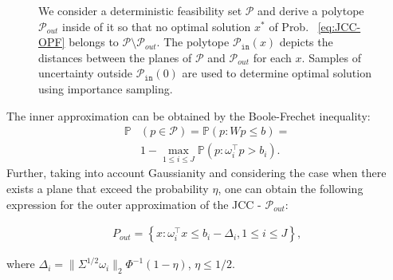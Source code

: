 \begin{figure}
\caption{We consider a deterministic feasibility set $\mathcal{P}$ and derive a polytope $\mathcal{P}_{out}$ inside of it so that no optimal solution $x^*$ of Prob.~ \eqref{eq:JCC-OPF} belongs to $\mathcal{P}\setminus \mathcal{P}_{out}$. The polytope $\mathcal{P}_{\texttt{in}}(x)$ depicts the distances between the planes of $\mathcal{P}$ and $\mathcal{P}_{out}$ for each $x$.
Samples of uncertainty outside $\mathcal{P}_{\texttt{in}}(0)$ are used to determine optimal solution using importance sampling.}
  \label{fig:10}
\end{figure}

The inner approximation can be obtained by the Boole-Frechet inequality:
\begin{align*}
  \mathbb{P}&(p\in \mathcal{P}) = 
  \mathbb{P}(p: Wp \le b) =\\
  & 1 - \max_{1\le i\le J}\mathbb{P}\left(p: \omega_i^\top p > b_i\right).
\end{align*}
Further, taking into account Gaussianity and considering the case when there exists a plane that exceed the probability $\eta$, one can obtain the following expression for the outer approximation of the JCC - $\mathcal{P}_{out}$:

\begin{align}\label{eq:05}
  P_{out} = \left\{x: \omega_i^\top x \le b_i - \Delta_i, 1\leq i\leq J\right\},
\end{align}

where $\Delta_i = \|\Sigma^{1/2}\omega_i\|_2 \Phi^{-1}(1-\eta)$, $\eta \le 1/2$.

